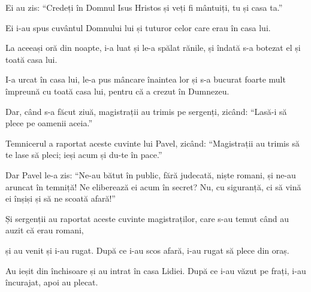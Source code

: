 {\par }{\PP {}Ei au zis: “Credeți în Domnul Isus Hristos și veți fi mântuiți, tu și casa ta.”

Ei i-au spus cuvântul Domnului lui și tuturor celor care erau în casa lui.


\par }{\PP {}La aceeași oră din noapte, i-a luat și le-a spălat rănile, și îndată s-a botezat el și toată casa lui.

I-a urcat în casa lui, le-a pus mâncare înaintea lor și s-a bucurat foarte mult împreună cu toată casa lui, pentru că a crezut în Dumnezeu.


\par }{\PP {}Dar, când s-a făcut ziuă, magistrații au trimis pe sergenți, zicând: “Lasă-i să plece pe oamenii aceia.”


\par }{\PP {}Temnicerul a raportat aceste cuvinte lui Pavel, zicând: “Magistrații au trimis să te lase să pleci; ieși acum și du-te în pace.”


\par }{\PP {}Dar Pavel le-a zis: “Ne-au bătut în public, fără judecată, niște romani, și ne-au aruncat în temniță! Ne eliberează ei acum în secret? Nu, cu siguranță, ci să vină ei înșiși și să ne scoată afară!”


\par }{\PP {}Și sergenții au raportat aceste cuvinte magistraților, care s-au temut când au auzit că erau romani,

și au venit și i-au rugat. După ce i-au scos afară, i-au rugat să plece din oraș.

Au ieșit din închisoare și au intrat în casa Lidiei. După ce i-au văzut pe frați, i-au încurajat, apoi au plecat.



\par }
